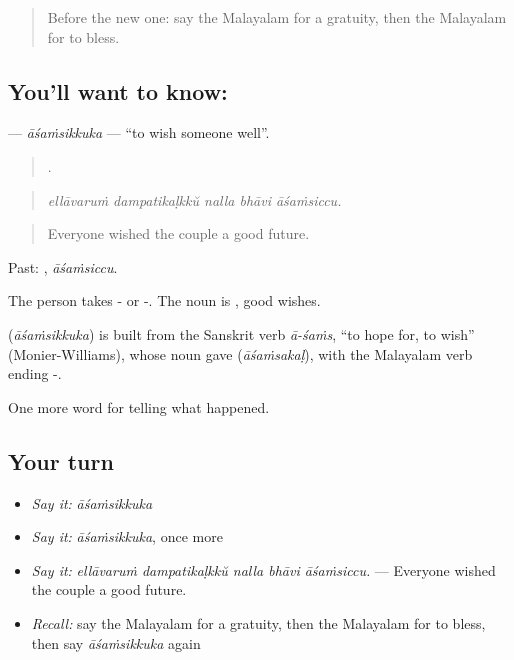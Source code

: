 \label{lesson:ML-C388-asamsikkuka}



\begin{quote}
Before the new one: say the Malayalam for a gratuity, then the Malayalam for to bless.
\end{quote}

\subsection*{You'll want to know: }
\textbf{} — \emph{āśaṁsikkuka} — \textquotedblleft{}to wish someone well\textquotedblright{}.

\begin{quote}
    .
\end{quote}

\begin{quote}
\emph{ellāvaruṁ dampatikaḷkkŭ nalla bhāvi āśaṁsiccu.}
\end{quote}

\begin{quote}
Everyone wished the couple a good future.
\end{quote}

Past: , \emph{āśaṁsiccu}.

The person takes - or -. The noun is , good wishes.

\begin{cousinweb}
\textbf{} (\emph{āśaṁsikkuka}) is built from the Sanskrit verb \emph{ā-śaṁs}, \textquotedblleft{}to hope for, to wish\textquotedblright{} (Monier-Williams), whose noun gave  (\emph{āśaṁsakaḷ}), with the Malayalam verb ending -.
\end{cousinweb}

\begin{grammarlens}[title={What you've built}]
One more word for telling what happened.
\end{grammarlens}

\subsection*{Your turn}
\begin{itemize}
\raggedright
  \item \emph{Say it:} \emph{āśaṁsikkuka}
  \item \emph{Say it:} \emph{āśaṁsikkuka}, once more
  \item \emph{Say it:} \emph{ellāvaruṁ dampatikaḷkkŭ nalla bhāvi āśaṁsiccu.} — Everyone wished the couple a good future.
  \item \emph{Recall:} say the Malayalam for a gratuity, then the Malayalam for to bless, then say \emph{āśaṁsikkuka} again
\end{itemize}

